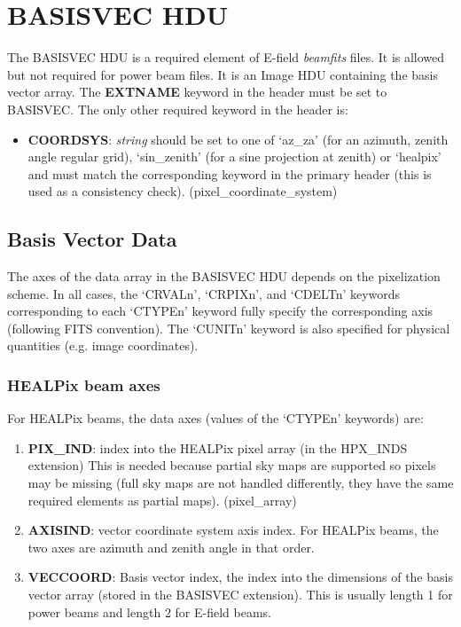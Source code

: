 \documentclass[11pt, oneside]{article}   	%
\begin{document}
\section{BASISVEC HDU}
The BASISVEC HDU is a required element of E-field \textit{beamfits} files. It is allowed but not required for power beam files. It is an Image HDU containing the basis vector array.
The \textbf{EXTNAME} keyword in the header must be set to BASISVEC. The only other required keyword in the header is:

\begin{itemize}
\item{\textbf{COORDSYS}: \textit{string} should be set to one of `az\_za' (for an azimuth, zenith angle regular grid), `sin\_zenith' (for a sine projection at zenith) or `healpix' and must match the corresponding keyword in the primary header (this is used as a consistency check). (pixel\_coordinate\_system)}
\end{itemize}

\subsection{Basis Vector Data}
The axes of the data array in the BASISVEC HDU depends on the pixelization scheme. In all cases, the `CRVALn', `CRPIXn', and `CDELTn' keywords corresponding to each `CTYPEn' keyword fully specify the corresponding axis (following FITS convention). The `CUNITn' keyword is also specified for physical quantities (e.g. image coordinates).

\subsubsection{HEALPix beam axes}
For HEALPix beams, the data axes (values of the `CTYPEn' keywords) are: 
\begin{enumerate}
\item{\textbf{PIX\_IND}: index into the HEALPix pixel array (in the HPX\_INDS extension) This is needed because partial sky maps are supported so pixels may be missing (full sky maps are not handled differently, they have the same required elements as partial maps). (pixel\_array)}
\item{\textbf{AXISIND}: vector coordinate system axis index. For HEALPix beams, the two axes are azimuth and zenith angle in that order.}
\item{\textbf{VECCOORD}: Basis vector index, the index into the dimensions of the basis vector array (stored in the BASISVEC extension). This is usually length 1 for power beams and length 2 for E-field beams.}
\end{enumerate}
\end{document}
